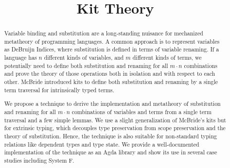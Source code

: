 \documentclass{llncs}
\title{Kit Theory}
\begin{document}
  \maketitle

  \begin{abstract}
    Variable binding and substitution are a long-standing nuisance for mechanized
    metatheory of programming languages. A common approach is to represent
    variables as DeBruijn Indices, where substitution is defined in terms of
    variable renaming. If a language has $n$ different kinds of variables, and
    $m$ different kinds of terms, we potentially need to define both
    substitution and renaming for all $m\cdot n$ combinations and prove the
    theory of those operations both in isolation and with respect to each other.
    McBride introduced kits to define both substitution and renaming by a
    single term traversal for intrinsically typed terms.\cite{mcbride2005kits}

    We propose a technique to derive the implementation and metatheory of
    substitution and renaming for all $m\cdot n$ combinations of variables and terms
    from a single term traversal and a few simple lemmas.
    We use a slight generalization of McBride's kits but for extrinsic typing,
    which decouples type preservation from scope preservation and the
    theory of substitution. Hence, the technique is also suitable for
    non-standard typing relations like dependent types and type state.
    We provide a well-documented implementation of the technique as an Agda
    library and show its use in several case studies including System F.
  \end{abstract}



  
  

  \clearpage
  \appendix
\end{document}
